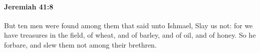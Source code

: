 
		\paragraph{Jeremiah 41:8} %
			\label{JEREMIAH-41-8}

			But ten men were found among them that said unto Ishmael, Slay us not: for we have treasures in the field, of wheat, and of barley, and of oil, and of honey. So he forbare, and slew them not among their brethren.


